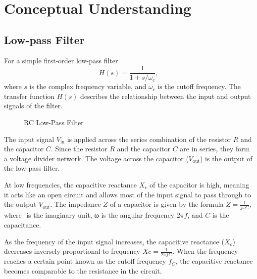\documentclass{zc-ust-hw}
\begin{document}
\newpage

\section{Conceptual Understanding}
\subsection{Low-pass Filter}
For a simple first-order low-pass filter
\begin{equation}
  H(s) = \frac{1}{1 + s/\omega_c},
\end{equation}
where \(s\) is the complex frequency variable, and \(\omega_c\) is the
cutoff frequency. The transfer function \(H(s)\) describes the
relationship between the input and output signals of the filter.
\begin{figure}[h]
  \centering
  \caption{RC Low-Pass Filter}
\end{figure}

The input signal $V_{\text{in}}$ is applied across the series combination of
the resistor $R$ and the capacitor $C$. Since the resistor $R$ and the
capacitor $C$ are in series, they form a voltage divider network. The voltage
across the capacitor ($V_{\text{out}}$) is the output of the low-pass filter. 

At low frequencies, the capacitive reactance $X_c$ of the capacitor is high,
meaning it acts like an open circuit and allows most of the input signal to
pass through to the output $V_{\text{out}}$. The impedance $Z$ of a capacitor
is given by the formula $Z = \frac{1}{j\omega C}$, where \(  \) is the
imaginary unit, ω is the angular frequency \( 2\pi f \), and $C$ is the
capacitance.

As the frequency of the input signal increases, the capacitive reactance ($X_{c}$)
decreases inversely proportional to frequency $Xc = \frac{1}{2πfC}$. When the
frequency reaches a certain point known as the cutoff frequency $f_C$, the
capacitive reactance becomes comparable to the resistance in the
circuit.
\end{document}
